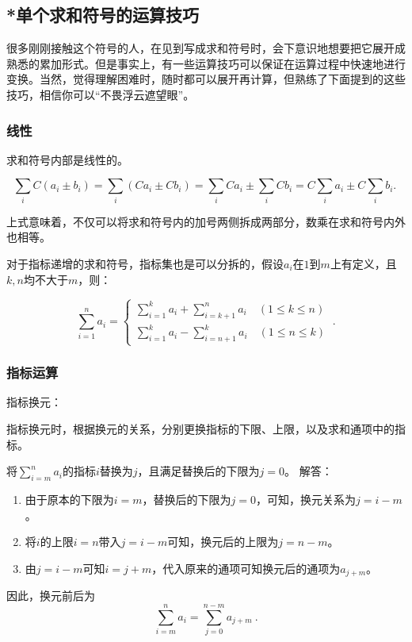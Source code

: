 \subsection{*单个求和符号的运算技巧}

很多刚刚接触这个符号的人，在见到写成求和符号时，会下意识地想要把它展开成熟悉的累加形式。但是事实上，有一些运算技巧可以保证在运算过程中快速地进行变换。当然，觉得理解困难时，随时都可以展开再计算，但熟练了下面提到的这些技巧，相信你可以“不畏浮云遮望眼”。

\subsubsection{线性}

求和符号内部是线性的。

\begin{equation}
\sum_{i} C(a_i \pm b_i) = \sum_{i} (Ca_i \pm Cb_i) =\sum_{i} Ca_i \pm \sum_{i} Cb_i=C\sum_{i} a_i \pm C\sum_{i} b_i.~
\end{equation}

上式意味着，不仅可以将求和符号内的加号两侧拆成两部分，数乘在求和符号内外也相等。

对于指标递增的求和符号，指标集也是可以分拆的，假设$a_i$在$1$到$m$上有定义，且$k,n$均不大于$m$，则：

\begin{equation}
\sum_{i=1}^n a_i  = \begin{cases}
\sum\limits_{i=1}^k a_i  +\sum\limits_{i=k+1}^n a_i \quad(1\leq k\leq n) \\
\sum\limits_{i=1}^k a_i  -\sum\limits_{i=n+1}^k a_i \quad(1\leq n\leq k) 
\end{cases} ~.
\end{equation}

\subsubsection{指标运算}

指标换元：

指标换元时，根据换元的关系，分别更换指标的下限、上限，以及求和通项中的指标。

\begin{example}{将$\sum\limits_{i=m}^n a_i$的指标$i$替换为$j$，且满足替换后的下限为$j=0$。}
解答：
\begin{enumerate}
\item 由于原本的下限为$i=m$，替换后的下限为$j=0$，可知，换元关系为$j=i-m$。
\item 将$i$的上限$i=n$带入$j=i-m$可知，换元后的上限为$j=n-m$。
\item 由$j=i-m$可知$i=j+m$，代入原来的通项可知换元后的通项为$a_{j+m}$。
\end{enumerate}

因此，换元前后为
\begin{equation}
\sum_{i=m}^n a_i = \sum_{j=0}^{n-m} a_{j+m}~.
\end{equation}
\end{example}



